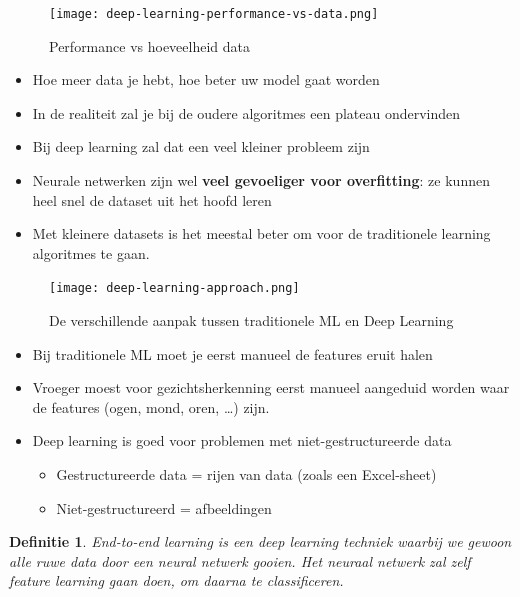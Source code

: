 \documentclass{article}
\newtheorem{theorem}{Definitie}[section]
\begin{document}
\begin{figure}[H]
    \centering
    \texttt{[image: deep-learning-performance-vs-data.png]}
    \caption{Performance vs hoeveelheid data}
\end{figure}

\begin{itemize}
    \item Hoe meer data je hebt, hoe beter uw model gaat worden
    \item In de realiteit zal je bij de oudere algoritmes een plateau ondervinden
    \item Bij deep learning zal dat een veel kleiner probleem zijn
    \item Neurale netwerken zijn wel \textbf{veel gevoeliger voor overfitting}: ze kunnen heel snel de dataset uit het hoofd leren
    \item Met kleinere datasets is het meestal beter om voor de traditionele learning algoritmes te gaan.
\end{itemize}

\begin{figure}[H]
    \centering
    \texttt{[image: deep-learning-approach.png]}
    \caption{De verschillende aanpak tussen traditionele ML en Deep Learning}
\end{figure}

\begin{itemize}
    \item Bij traditionele ML moet je eerst manueel de features eruit halen
    \item Vroeger moest voor gezichtsherkenning eerst manueel aangeduid worden waar de features (ogen, mond, oren, \dots) zijn.
    \item Deep learning is goed voor problemen met niet-gestructureerde data
    \begin{itemize}
        \item Gestructureerde data = rijen van data (zoals een Excel-sheet)
        \item Niet-gestructureerd = afbeeldingen
    \end{itemize}
\end{itemize}

\begin{theorem}
    End-to-end learning is een deep learning techniek waarbij we gewoon alle ruwe data door een neural netwerk
    gooien. Het neuraal netwerk zal zelf feature learning gaan doen, om daarna te classificeren.
\end{theorem}
\end{document}
